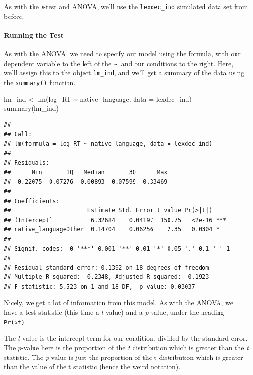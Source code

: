 \documentclass[
]{book}
\newenvironment{Shaded}{\begin{snugshade}}{\end{snugshade}}
\newcommand{\AttributeTok}[1]{\textcolor[rgb]{0.77,0.63,0.00}{#1}}
\newcommand{\FunctionTok}[1]{\textcolor[rgb]{0.00,0.00,0.00}{#1}}
\newcommand{\NormalTok}[1]{#1}
\newcommand{\OtherTok}[1]{\textcolor[rgb]{0.56,0.35,0.01}{#1}}
\newcommand{\SpecialCharTok}[1]{\textcolor[rgb]{0.00,0.00,0.00}{#1}}
\begin{document}
As with the \emph{t}-test and ANOVA, we'll use the \texttt{lexdec\_ind} simulated data set from before.

\hypertarget{running-the-test-3}{%
\paragraph{Running the Test}\label{running-the-test-3}}

As with the ANOVA, we need to specify our model using the formula, with our dependent variable to the left of the \texttt{\textasciitilde{}}, and our conditions to the right. Here, we'll assign this to the object \texttt{lm\_ind}, and we'll get a summary of the data using the \texttt{summary()} function.

\begin{Shaded}
\begin{Highlighting}[]
\NormalTok{lm\_ind }\OtherTok{\textless{}{-}} \FunctionTok{lm}\NormalTok{(log\_RT }\SpecialCharTok{\textasciitilde{}}\NormalTok{ native\_language, }\AttributeTok{data =}\NormalTok{ lexdec\_ind)}
\FunctionTok{summary}\NormalTok{(lm\_ind)}
\end{Highlighting}
\end{Shaded}

\begin{verbatim}
## 
## Call:
## lm(formula = log_RT ~ native_language, data = lexdec_ind)
## 
## Residuals:
##      Min       1Q   Median       3Q      Max 
## -0.22075 -0.07276 -0.00893  0.07599  0.33469 
## 
## Coefficients:
##                      Estimate Std. Error t value Pr(>|t|)    
## (Intercept)           6.32684    0.04197  150.75   <2e-16 ***
## native_languageOther  0.14704    0.06256    2.35   0.0304 *  
## ---
## Signif. codes:  0 '***' 0.001 '**' 0.01 '*' 0.05 '.' 0.1 ' ' 1
## 
## Residual standard error: 0.1392 on 18 degrees of freedom
## Multiple R-squared:  0.2348, Adjusted R-squared:  0.1923 
## F-statistic: 5.523 on 1 and 18 DF,  p-value: 0.03037
\end{verbatim}

Nicely, we get a lot of information from this model. As with the ANOVA, we have a test statistic (this time a \emph{t}-value) and a \emph{p}-value, under the heading \texttt{Pr(\textgreater{}\textbar{}t\textbar{})}.

The \emph{t}-value is the intercept term for our condition, divided by the standard error. The \emph{p}-value here is the proportion of the \emph{t} distribution which is greater than the \emph{t} statistic. The \emph{p}-value is just the proportion of the t distribution which is greater than the value of the t statistic (hence the weird notation).
\end{document}
